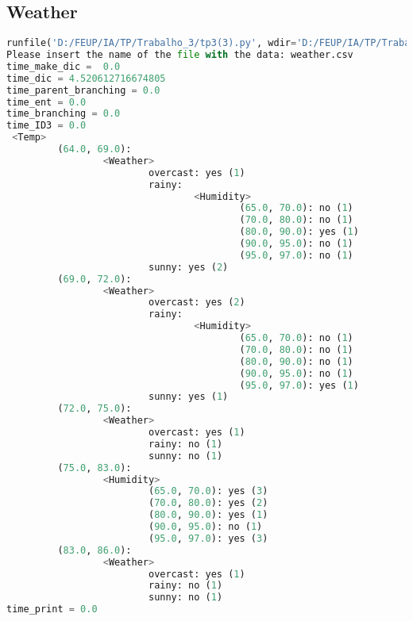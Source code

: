 \documentclass{article}
\begin{document}
\subsection{Weather}
\begin{lstlisting}[language = Python]
runfile('D:/FEUP/IA/TP/Trabalho_3/tp3(3).py', wdir='D:/FEUP/IA/TP/Trabalho_3')
Please insert the name of the file with the data: weather.csv
time_make_dic =  0.0
time_dic = 4.520612716674805
time_parent_branching = 0.0
time_ent = 0.0
time_branching = 0.0
time_ID3 = 0.0
 <Temp>
         (64.0, 69.0):
                 <Weather>
                         overcast: yes (1)
                         rainy:
                                 <Humidity>
                                         (65.0, 70.0): no (1)
                                         (70.0, 80.0): no (1)
                                         (80.0, 90.0): yes (1)
                                         (90.0, 95.0): no (1)
                                         (95.0, 97.0): no (1)
                         sunny: yes (2)
         (69.0, 72.0):
                 <Weather>
                         overcast: yes (2)
                         rainy:
                                 <Humidity>
                                         (65.0, 70.0): no (1)
                                         (70.0, 80.0): no (1)
                                         (80.0, 90.0): no (1)
                                         (90.0, 95.0): no (1)
                                         (95.0, 97.0): yes (1)
                         sunny: yes (1)
         (72.0, 75.0):
                 <Weather>
                         overcast: yes (1)
                         rainy: no (1)
                         sunny: no (1)
         (75.0, 83.0):
                 <Humidity>
                         (65.0, 70.0): yes (3)
                         (70.0, 80.0): yes (2)
                         (80.0, 90.0): yes (1)
                         (90.0, 95.0): no (1)
                         (95.0, 97.0): yes (3)
         (83.0, 86.0):
                 <Weather>
                         overcast: yes (1)
                         rainy: no (1)
                         sunny: no (1)
time_print = 0.0
\end{lstlisting}
\end{document}
